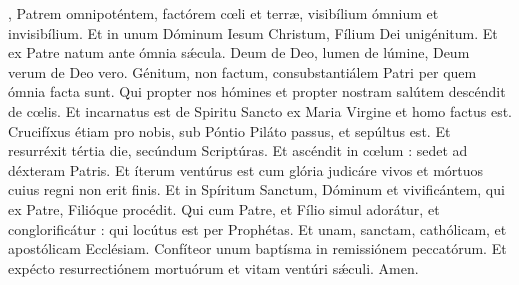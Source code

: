 , Patrem omnipoténtem, factórem c{\oe}li et terr{\ae}, visibílium ómnium et invisibílium.
Et in unum Dóminum Iesum Christum, Fílium Dei unigénitum. Et ex Patre natum ante ómnia s{\'\ae}cula. Deum de Deo, lumen de lúmine, 
Deum verum de Deo vero. Génitum, non factum, consubstantiálem Patri per quem ómnia facta sunt. Qui propter nos hómines et propter 
nostram salútem descéndit de c{\oe}lis. Et incarnatus est de Spiritu Sancto ex Maria Virgine et homo factus est. Crucifíxus étiam pro nobis, 
sub Póntio Piláto passus, et sepúltus est. Et resurréxit tértia die, secúndum Scriptúras. Et ascéndit in c{\oe}lum : sedet ad déxteram Patris. 
Et íterum ventúrus est cum glória judicáre vivos et mórtuos cuius regni non erit finis. Et in Spíritum Sanctum, Dóminum et vivificántem, qui ex Patre, 
Filióque procédit. Qui cum Patre, et Fílio simul adorátur, et conglorificátur : qui locútus est per Prophétas. Et unam, sanctam, cathólicam, 
et apostólicam Ecclésiam. Confíteor unum baptísma in remissiónem peccatórum. Et expécto resurrectiónem mortuórum et vitam ventúri s{\'\ae}culi. Amen.